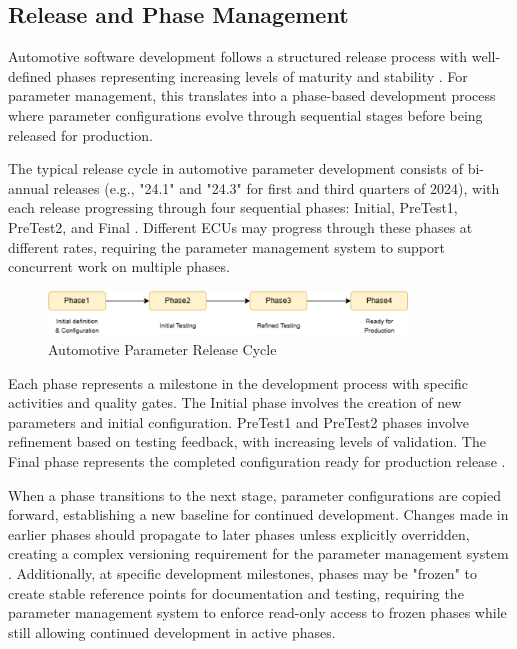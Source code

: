 \subsection{Release and Phase Management}
\label{subsec:release-phase-management}

Automotive software development follows a structured release process with well-defined phases representing increasing levels of maturity and stability \cite{broy2006challenges}. For parameter management, this translates into a phase-based development process where parameter configurations evolve through sequential stages before being released for production.

The typical release cycle in automotive parameter development consists of bi-annual releases (e.g., "24.1" and "24.3" for first and third quarters of 2024), with each release progressing through four sequential phases: Initial, PreTest1, PreTest2, and Final \cite{pretschner2007software}. Different ECUs may progress through these phases at different rates, requiring the parameter management system to support concurrent work on multiple phases.

\begin{figure}[ht]
    \centering
    \includegraphics[width=0.85\textwidth]{figures/release_cycle.png}
    \caption{Automotive Parameter Release Cycle}
    \label{fig:release-cycle}
\end{figure}

Each phase represents a milestone in the development process with specific activities and quality gates. The Initial phase involves the creation of new parameters and initial configuration. PreTest1 and PreTest2 phases involve refinement based on testing feedback, with increasing levels of validation. The Final phase represents the completed configuration ready for production release \cite{staron2021automotive}.

When a phase transitions to the next stage, parameter configurations are copied forward, establishing a new baseline for continued development. Changes made in earlier phases should propagate to later phases unless explicitly overridden, creating a complex versioning requirement for the parameter management system \cite{pretschner2007software}. Additionally, at specific development milestones, phases may be "frozen" to create stable reference points for documentation and testing, requiring the parameter management system to enforce read-only access to frozen phases while still allowing continued development in active phases.

